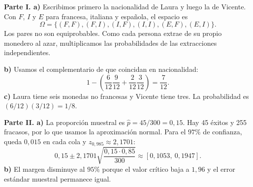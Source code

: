 \textbf{Parte I. a)} Escribimos primero la nacionalidad de Laura y luego la de Vicente. Con $F$, $I$ y $E$ para francesa, italiana y española, el espacio es
\[
 \Omega=\{(F,F),(F,I),(I,F),(I,I),(E,F),(E,I)\}.
\]
Los pares no son equiprobables. Como cada persona extrae de su propio monedero al azar, multiplicamos las probabilidades de las extracciones independientes.

\textbf{b)} Usamos el complementario de que coincidan en nacionalidad:
\[
 1-\left(\frac{6}{12}\frac{9}{12}+\frac{2}{12}\frac{3}{12}\right)
 =\boxed{\frac{7}{12}}.
\]
\textbf{c)} Laura tiene seis monedas no francesas y Vicente tiene tres. La probabilidad es $(6/12)(3/12)=\boxed{1/8}$.

\textbf{Parte II. a)} La proporción muestral es $\hat p=45/300=0{,}15$. Hay 45 éxitos y 255 fracasos, por lo que usamos la aproximación normal. Para el $97\%$ de confianza, queda $0{,}015$ en cada cola y $z_{0{,}985}\approx2{,}1701$:
\[
 0{,}15\pm2{,}1701\sqrt{\frac{0{,}15\cdot0{,}85}{300}}
 \approx\boxed{[0{,}1053,\ 0{,}1947]}.
\]
\textbf{b)} El margen disminuye al $95\%$ porque el valor crítico baja a $1{,}96$ y el error estándar muestral permanece igual.

